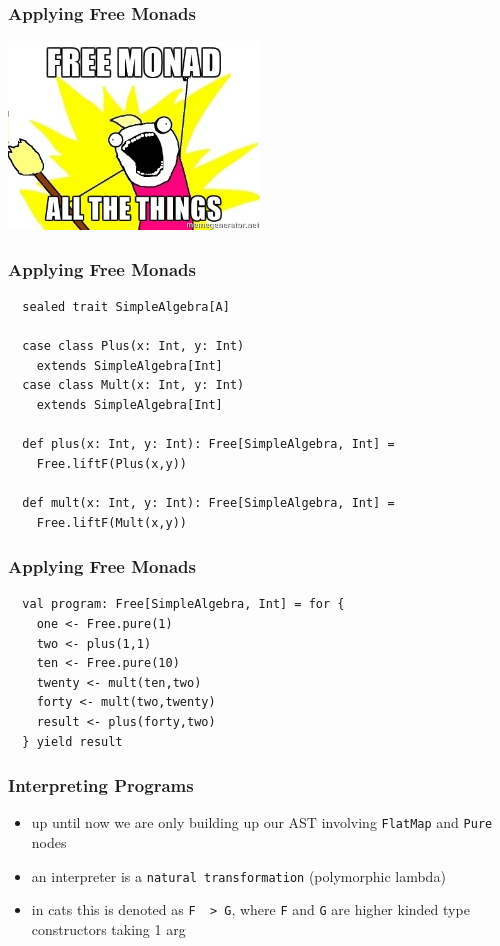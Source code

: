 \documentclass{beamer}
\begin{document}
\begin{frame}
  \frametitle{Applying Free Monads}
  \begin{center}
    \includegraphics[height=5cm]{pics/free-monad-all.jpg}
  \end{center}
\end{frame}

\begin{frame}[fragile]
  \frametitle{Applying Free Monads}
\begin{verbatim}
  sealed trait SimpleAlgebra[A]

  case class Plus(x: Int, y: Int)
    extends SimpleAlgebra[Int]
  case class Mult(x: Int, y: Int)
    extends SimpleAlgebra[Int]

  def plus(x: Int, y: Int): Free[SimpleAlgebra, Int] =
    Free.liftF(Plus(x,y))

  def mult(x: Int, y: Int): Free[SimpleAlgebra, Int] =
    Free.liftF(Mult(x,y))
\end{verbatim}
\end{frame}

\begin{frame}[fragile]
  \frametitle{Applying Free Monads}
\begin{verbatim}
  val program: Free[SimpleAlgebra, Int] = for {
    one <- Free.pure(1)
    two <- plus(1,1)
    ten <- Free.pure(10)
    twenty <- mult(ten,two)
    forty <- mult(two,twenty)
    result <- plus(forty,two)
  } yield result
\end{verbatim}
\end{frame}

\begin{frame}
  \frametitle{Interpreting Programs}
  \begin{itemize}
  \item up until now we are only building up our AST involving
    \texttt{FlatMap} and \texttt{Pure} nodes
  \item an interpreter is a \texttt{natural transformation}
    (polymorphic lambda)
  \item in cats this is denoted as \texttt{F ~> G}, where \texttt{F}
    and \texttt{G} are higher kinded type constructors taking 1 arg
  \end{itemize}
\end{frame}
\end{document}
